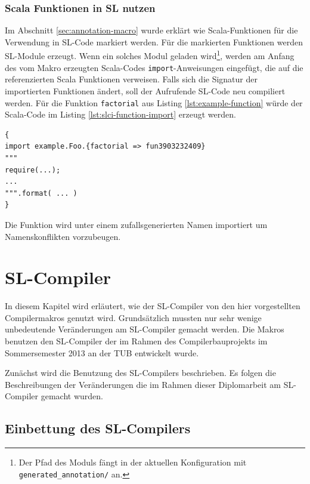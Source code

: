 \documentclass[12pt,bibtotoc]{scrreprt}
\begin{document}
\subsection{Scala Funktionen in SL nutzen}
\label{subsec:use-scala-function-in-sl}

Im Abschnitt \ref{sec:annotation-macro} wurde erklärt wie Scala-Funktionen für die Verwendung in \ac{SL}-Code markiert werden. Für die markierten Funktionen werden \ac{SL}-Module erzeugt. Wenn ein solches Modul geladen wird\footnote{Der Pfad des Moduls fängt in der aktuellen Konfiguration mit \lstinline!generated_annotation/! an.}, werden am Anfang des vom Makro erzeugten Scala-Codes \lstinline!import!-Anweisungen eingefügt, die auf die referenzierten Scala Funktionen verweisen. Falls sich die Signatur der importierten Funktionen ändert, soll der Aufrufende SL-Code neu compiliert werden.
Für die Funktion \lstinline!factorial! aus Listing \ref{lst:example-function} würde der Scala-Code im Listing \ref{lst:slci-function-import} erzeugt werden.

\begin{lstlisting}[caption={Scala \lstinline!import!-Anweisung für eine annotierte Funktion}, label=lst:slci-function-import, float=h]
{
import example.Foo.{factorial => fun3903232409}
"""
require(...);
...
""".format( ... )
}
\end{lstlisting}

Die Funktion wird unter einem zufallsgenerierten Namen importiert um Namenskonflikten vorzubeugen.

\chapter{SL-Compiler}
\label{chap:dom-monad-extensions}

In diesem Kapitel wird erläutert, wie der SL-Compiler von den hier vorgestellten Compilermakros genutzt wird. Grundsätzlich mussten nur sehr wenige unbedeutende Veränderungen am SL-Compiler gemacht werden. Die Makros benutzen den SL-Compiler der im Rahmen des Compilerbauprojekts im Sommersemester 2013 an der \ac{TUB} entwickelt wurde\cite{Bisping2013}.

Zunächst wird die Benutzung des SL-Compilers beschrieben. Es folgen die Beschreibungen der Veränderungen die im Rahmen dieser Diplomarbeit am SL-Compiler gemacht wurden.

\section{Einbettung des SL-Compilers}
\end{document}

